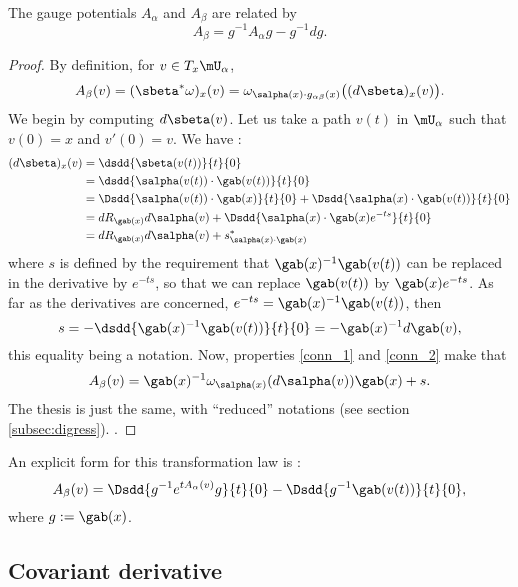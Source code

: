 \begin{proposition}
The gauge potentials $A_{\alpha}$ and $A_{\beta}$ are related by
\begin{equation}\label{trans_A}
                A_{\beta}=g^{-1} A_{\alpha} g-g^{-1} dg.
\end{equation}
\label{prop:trans_A}
\end{proposition}

\begin{proof}
By definition, for $v\in T_x\mU_{\alpha}$,
\[
   A_{\beta}(v)=(\sbeta^*\omega)_x(v)=
         \omega_{\salpha(x)\cdot g_{\alpha\beta}(x)}\big((d\sbeta)_x(v)\big).
\]
We begin by computing $d\sbeta(v)$. Let us take a path $v(t)$ in $\mU_{\alpha}$ such that $v(0)=x$ and $v'(0)=v$. We have :
\begin{equation}\label{eq:1407r1}
\begin{split}
   (d\sbeta)_x(v)&=\dsdd{\sbeta(v(t))}{t}{0}\\
                 &=\dsdd{\salpha(v(t))\cdot\gab(v(t))}{t}{0}\\
		 &=\Dsdd{\salpha(v(t))\cdot\gab(x)}{t}{0}
		    +\Dsdd{\salpha(x)\cdot\gab(v(t))}{t}{0}\\
		 &=dR_{\gab(x)}d\salpha(v)+\Dsdd{\salpha(x)\cdot\gab(x)e^{-ts}}{t}{0}\\
		 &=dR_{\gab(x)}d\salpha(v)+s^*_{\salpha(x)\cdot\gab(x)}
\end{split}
\end{equation}
where $s$ is defined by the requirement\label{pg:justif_s} that $\gab(x)^{-1}\gab(v(t))$ can be replaced in the derivative by $e^{-ts}$, so that we can replace $\gab(v(t))$ by $\gab(x)e^{-ts}$. As far as the derivatives are concerned, $e^{-ts}=\gab(x)^{-1}\gab(v(t))$, then
\[
     s=-\dsdd{\gab(x)^{-1}\gab(v(t))}{t}{0}=-\gab(x)^{-1} d\gab(v),
\]
this equality being a notation. Now, properties \eqref{conn_1} and \eqref{conn_2} make that
\[
   A_{\beta}(v)=\gab(x)^{-1}\omega_{\salpha(x)}(d\salpha(v))\gab(x)+s.
\]
The thesis is just the same, with ``reduced'' notations (see section \ref{subsec:digress}).
.
\end{proof}
An explicit form for this transformation law is :
\begin{equation}
    A_{\beta}(v)=\Dsdd{g^{-1} e^{tA_{\alpha}(v)}g}{t}{0}-\Dsdd{g^{-1}\gab(v(t))}{t}{0},
\end{equation}
where $g:=\gab(x)$.

\subsection{Covariant derivative}

